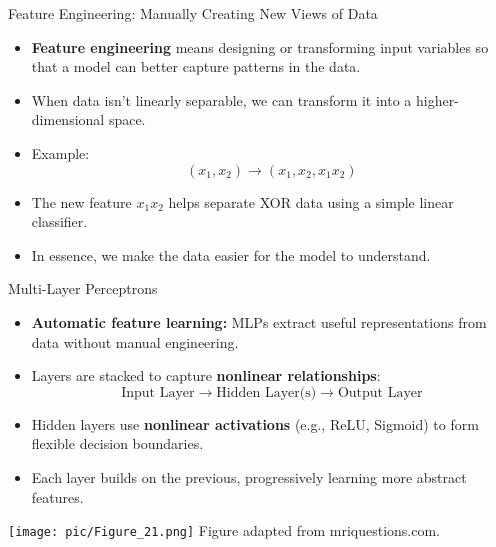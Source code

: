 \documentclass[serif, aspectratio=169]{beamer}
\begin{document}
    \begin{frame}{Feature Engineering: Manually Creating New Views of Data}
        \begin{itemize}\itemsep1em
        \item \textbf{Feature engineering} means designing or transforming input variables
        so that a model can better capture patterns in the data.
        \item When data isn’t linearly separable, we can transform it into a higher-dimensional space.
        \item Example:
        \[
            (x_1, x_2) \rightarrow (x_1, x_2, x_1x_2)
        \]
        \item The new feature \(x_1x_2\) helps separate XOR data using a simple linear classifier.
        \item In essence, we make the data easier for the model to understand.
        \end{itemize}
    \end{frame}
    \begin{frame}{Multi-Layer Perceptrons}
        \begin{itemize}\itemsep1em
        \item \textbf{Automatic feature learning:} MLPs extract useful representations from data without manual engineering.
        \item Layers are stacked to capture \textbf{nonlinear relationships}:
        \[
            \text{Input Layer} \rightarrow \text{Hidden Layer(s)} \rightarrow \text{Output Layer}
        \]
        \item Hidden layers use \textbf{nonlinear activations} (e.g., ReLU, Sigmoid) to form flexible decision boundaries.
        \item Each layer builds on the previous, progressively learning more abstract features.
        \end{itemize}
        \endminipage
        \hfill
        \centering
        \texttt{[image: pic/Figure\_21.png]}
        \vspace{0.3em}
        \scriptsize Figure adapted from mriquestions.com.
        \endminipage
    \end{frame}
\end{document}
